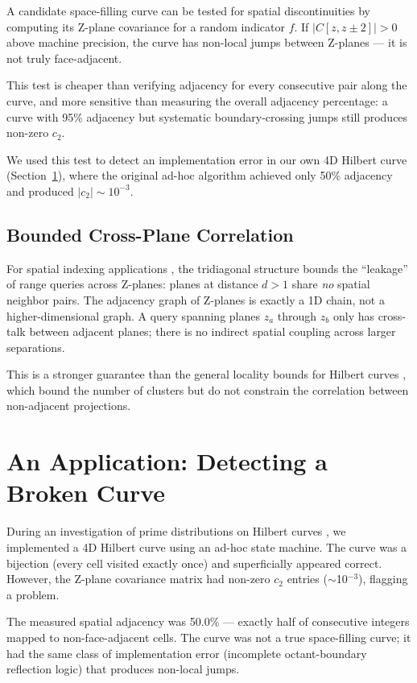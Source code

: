 \documentclass[11pt,a4paper]{article}
\begin{document}
A candidate space-filling curve can be tested for spatial discontinuities
by computing its Z-plane covariance for a random indicator $f$. If
$|C[z, z\pm 2]| > 0$ above machine precision, the curve has non-local
jumps between Z-planes --- it is not truly face-adjacent.

This test is cheaper than verifying adjacency for every consecutive pair
along the curve, and more sensitive than measuring the overall adjacency
percentage: a curve with 95\% adjacency but systematic boundary-crossing
jumps still produces non-zero $c_2$.

We used this test to detect an implementation error in our own 4D Hilbert
curve (Section~\ref{sec:example}), where the original ad-hoc algorithm
achieved only 50\% adjacency and produced $|c_2| \sim 10^{-3}$.

\subsection{Bounded Cross-Plane Correlation}

For spatial indexing applications \cite{moon2001}, the tridiagonal
structure bounds the ``leakage'' of range queries across Z-planes:
planes at distance $d > 1$ share \emph{no} spatial neighbor pairs. The
adjacency graph of Z-planes is exactly a 1D chain, not a higher-dimensional
graph. A query spanning planes $z_a$ through $z_b$ only has cross-talk
between adjacent planes; there is no indirect spatial coupling across
larger separations.

This is a stronger guarantee than the general locality bounds for Hilbert
curves \cite{moon2001}, which bound the number of clusters but do not
constrain the correlation between non-adjacent projections.

\section{An Application: Detecting a Broken Curve}
\label{sec:example}

During an investigation of prime distributions on Hilbert curves
\cite{wesson2026}, we implemented a 4D Hilbert curve using an ad-hoc
state machine. The curve was a bijection (every cell visited exactly once)
and superficially appeared correct. However, the Z-plane covariance matrix
had non-zero $c_2$ entries ($\sim$10$^{-3}$), flagging a problem.

The measured spatial adjacency was 50.0\% --- exactly half of consecutive
integers mapped to non-face-adjacent cells. The curve was not a true
space-filling curve; it had the same class of implementation error
(incomplete octant-boundary reflection logic) that produces non-local
jumps.
\end{document}
